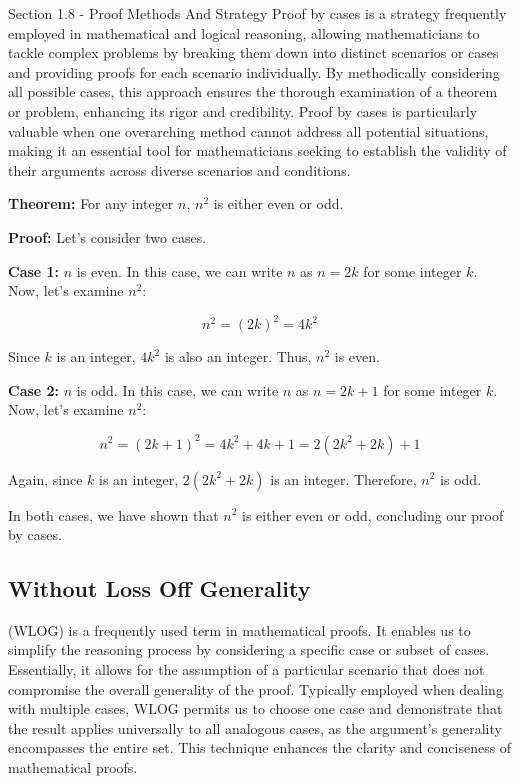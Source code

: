 \begin{notes}{Section 1.8 - Proof Methods And Strategy}
    Proof by cases is a strategy frequently employed in mathematical and logical reasoning, allowing mathematicians to tackle complex problems by breaking them down into distinct scenarios or cases and providing 
    proofs for each scenario individually. By methodically considering all possible cases, this approach ensures the thorough examination of a theorem or problem, enhancing its rigor and credibility. Proof by 
    cases is particularly valuable when one overarching method cannot address all potential situations, making it an essential tool for mathematicians seeking to establish the validity of their arguments across 
    diverse scenarios and conditions.

    \begin{Highlight}
        \textbf{Theorem:} For any integer \(n\), \(n^2\) is either even or odd.
    
    
        \textbf{Proof:} Let's consider two cases. \vspace*{1em}
    
        \textbf{Case 1:} \(n\) is even. In this case, we can write \(n\) as \(n = 2k\) for some integer \(k\). Now, let's examine \(n^2\):
        
        \[n^2 = (2k)^2 = 4k^2\]
        
        Since \(k\) is an integer, \(4k^2\) is also an integer. Thus, \(n^2\) is even.
    
        \textbf{Case 2:} \(n\) is odd. In this case, we can write \(n\) as \(n = 2k + 1\) for some integer \(k\). Now, let's examine \(n^2\):
        
        \[n^2 = (2k + 1)^2 = 4k^2 + 4k + 1 = 2(2k^2 + 2k) + 1\]
        
        Again, since \(k\) is an integer, \(2(2k^2 + 2k)\) is an integer. Therefore, \(n^2\) is odd.
    
    
        In both cases, we have shown that \(n^2\) is either even or odd, concluding our proof by cases.
    \end{Highlight}
    
    \subsection*{Without Loss Off Generality}

    (WLOG) is a frequently used term in mathematical proofs. It enables us to simplify the reasoning process by considering a specific case or subset of cases. Essentially, it allows for the assumption of a particular 
    scenario that does not compromise the overall generality of the proof. Typically employed when dealing with multiple cases, WLOG permits us to choose one case and demonstrate that the result applies universally to 
    all analogous cases, as the argument's generality encompasses the entire set. This technique enhances the clarity and conciseness of mathematical proofs.


\end{notes}
